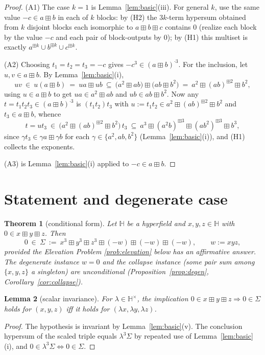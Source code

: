 \documentclass[11pt]{article}
\newtheorem{theorem}{Theorem}[section]
\newtheorem{lemma}[theorem]{Lemma}
\theoremstyle{definition}
\theoremstyle{remark}
\newcommand{\Hb}{\mathbb{H}}
\newcommand{\bp}{\boxplus}
\begin{document}
\begin{proof}
(A1) The case $k=1$ is Lemma~\ref{lem:basic}(iii). For general $k$, use the
same value $-c\in a\bp b$ in each of $k$ blocks: by (H2) the $3k$-term
hypersum obtained from $k$ disjoint blocks each isomorphic to
$a\bp b\bp c$ contains $0$ (realize each block by the value $-c$ and each
pair of block-outputs by $0$); by (H1) this multiset is exactly
$a^{\bp k}\cup b^{\bp k}\cup c^{\bp k}$.

(A2) Choosing $t_1=t_2=t_3=-c$ gives $-c^3\in(a\bp b)^{\cdot3}$. For the
inclusion, let $u,v\in a\bp b$. By Lemma~\ref{lem:basic}(i),
\[
  uv\ \in\ u(a\bp b)\ =\ ua\bp ub\ \subseteq\
   \bigl(a^2\bp ab\bigr)\bp\bigl(ab\bp b^2\bigr)
   \ =\ a^2\bp(ab)^{\bp2}\bp b^2 ,
\]
using $u\in a\bp b$ to get $ua\in a^2\bp ab$ and $ub\in ab\bp b^2$. Now
any $t=t_1t_2t_3\in(a\bp b)^{\cdot3}$ is $(t_1t_2)t_3$ with
$u:=t_1t_2\in a^2\bp(ab)^{\bp2}\bp b^2$ and $t_3\in a\bp b$, whence
\[
  t=ut_3\ \in\ \bigl(a^2\bp(ab)^{\bp2}\bp b^2\bigr)\,t_3
  \ \subseteq\ a^3\bp(a^2b)^{\bp3}\bp(ab^2)^{\bp3}\bp b^3,
\]
since $\gamma t_3\in\gamma a\bp\gamma b$ for each
$\gamma\in\{a^2,ab,b^2\}$ (Lemma~\ref{lem:basic}(i)), and (H1) collects
the exponents.

(A3) is Lemma~\ref{lem:basic}(i) applied to $-c\in a\bp b$.
\end{proof}

\section{Statement and degenerate case}\label{sec:easy}

\begin{theorem}[conditional form]\label{thm:main}
Let $\Hb$ be a hyperfield and $x,y,z\in\Hb$ with $0\in x\bp y\bp z$. Then
\[
  0\ \in\ \Sigma\ :=\
   x^3\bp y^3\bp z^3\bp(-w)\bp(-w)\bp(-w),\qquad w:=xyz,
\]
provided the Elevation Problem \ref{prob:elevation} below has an
affirmative answer. The degenerate instance $w=0$ and the collapse
instance (some pair sum among $\{x,y,z\}$ a singleton) are unconditional
(Proposition~\ref{prop:degen}, Corollary~\ref{cor:collapse}).
\end{theorem}

\begin{lemma}[scalar invariance]\label{lem:scale}
For $\lambda\in\Hb^\times$, the implication
$0\in x\bp y\bp z\Rightarrow0\in\Sigma$ holds for $(x,y,z)$ iff it holds
for $(\lambda x,\lambda y,\lambda z)$.
\end{lemma}
\begin{proof}
The hypothesis is invariant by Lemma~\ref{lem:basic}(v). The conclusion
hypersum of the scaled triple equals $\lambda^3\Sigma$ by repeated use of
Lemma~\ref{lem:basic}(i), and $0\in\lambda^3\Sigma\iff0\in\Sigma$.
\end{proof}
\end{document}
